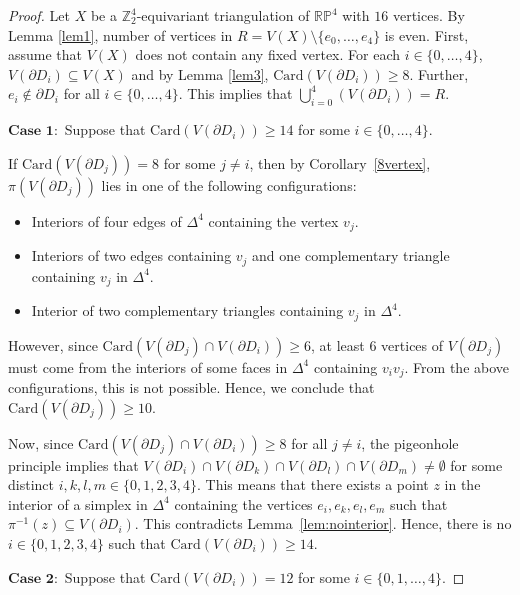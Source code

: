 \documentclass[10pt,a4paper]{amsart}
\newcommand{\D}{\Delta}
\def \ZZ{{\bb{Z}}}
\def \bb{\mathbb}
\begin{document}
\begin{proof}
Let $X$ be a $\ZZ_2^4$-equivariant triangulation of $\mathbb{RP}^4$ with $16$ vertices.  By Lemma \ref{lem1}, number of vertices in $R =V(X)\setminus \{e_0,\ldots,e_4\}$ is even. First, assume that $V(X)$ does not contain any fixed vertex. For each $i\in \{0,\ldots,4\}$, $V(\partial D_i)\subseteq V(X)$ and  by Lemma \ref{lem3}, $\mathrm{Card}( V(\partial D_i)) \geq 8$. Further, $e_i\notin \partial D_i$ for all $i\in \{0,\ldots,4\}$. This implies that $\bigcup_{i=0}^{4}(V(\partial D_i))=R$.


$\textbf{Case 1}:$ Suppose that $\mathrm{Card}(V(\partial  D_i)) \geq 14$  for some $i \in \{0, \ldots, 4\}$.

If $\mathrm{Card}(V(\partial D_j)) = 8$ for some $j\neq i$, then by Corollary~\ref{8vertex}, $\pi(V(\partial D_j))$ lies in one of the following configurations:  
\begin{itemize}
    \item[(i)] Interiors of four edges of $\D^4$ containing the vertex $v_j$.

    \item [(ii)]  Interiors of two edges containing $v_j$ and one complementary triangle containing $v_j$ in $\Delta^4$.

    \item  [(iii)] Interior of two complementary triangles containing $v_j$ in $\Delta^4$.
\end{itemize}
   
   However, since $\mathrm{Card}(V(\partial D_j) \cap V(\partial D_i)) \ge 6$, at least $6$ vertices of $V(\partial D_j)$ must come from the interiors of some faces in $\D^4$ containing $v_iv_j$. From the above configurations, this is not possible.
Hence, we conclude that $\mathrm{Card}(V(\partial D_j)) \ge 10$.

Now, since $\mathrm{Card}(V(\partial D_j) \cap V(\partial D_i)) \ge 8$ for all $j \neq i$, the pigeonhole principle implies that  
$V(\partial D_i) \cap V(\partial D_k) \cap V(\partial D_l) \cap V(\partial D_m) \neq \emptyset$  
for some distinct $i, k, l, m \in \{0,1,2,3,4\}$. This means that there exists a point $z$ in the interior of a simplex in $\D^4$ containing the vertices $e_i, e_k, e_l, e_m$ such that $\pi^{-1}(z) \subseteq V(\partial D_i)$. This contradicts Lemma~\ref{lem:nointerior}. Hence, there is no $i \in \{0,1,2,3,4\}$ such that $\mathrm{Card}(V(\partial D_i)) \ge 14$.



$\textbf{Case 2}:$ Suppose that $\mathrm{Card}(V(\partial D_i))= 12$ for some $i\in \{0,1,\ldots,4\}$. 


\end{proof}
\end{document}
